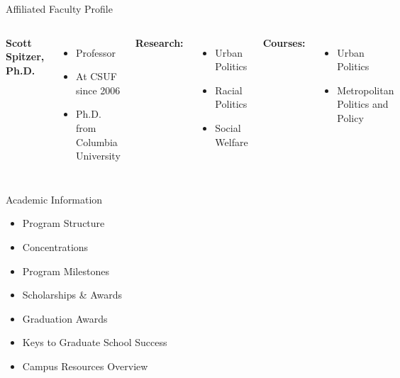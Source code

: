 \documentclass[10pt]{beamer}
\newlength{\imageheight}
\begin{document}
\begin{frame}{Affiliated Faculty Profile}
    \begin{columns}[T]
    \textbf{Scott Spitzer, Ph.D.}
    \begin{itemize}
    \item Professor
    \item At CSUF since 2006
    \item Ph.D. from Columbia University
    \end{itemize}
    
    \textbf{Research:} 
    \begin{itemize}
    \item Urban Politics
    \item Racial Politics
    \item Social Welfare
    \end{itemize}

    \textbf{Courses:} 
    \begin{itemize}
    \item Urban Politics
    \item Metropolitan Politics and Policy
    \end{itemize}
    
    \vspace*{0.5cm}
    \includegraphics[height=\imageheight]{images/spitzer.png}
    \end{columns}
    \end{frame}
    
\begin{frame}{Academic Information}
\begin{itemize}
\item Program Structure
\item Concentrations
\item Program Milestones
\item Scholarships \& Awards
\item Graduation Awards
\item Keys to Graduate School Success
\item Campus Resources Overview
\end{itemize}
\end{frame}
\end{document}
